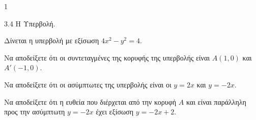 \begin{ylh}{1}
    \item 3.4 Η Υπερβολή.
\end{ylh}
Δίνεται η υπερβολή με εξίσωση $4x^2 - y^2 = 4$.
\begin{alist}
\item Να αποδείξετε ότι οι συντεταγμένες της κορυφής της υπερβολής είναι $A(1,0)$ και $A'(-1,0)$. 
\item Να αποδείξετε ότι οι ασύμπτωτες της υπερβολής είναι οι $y = 2x$ και $y = -2x$. 
\item Να αποδείξετε ότι η ευθεία που διέρχεται από την κορυφή $A$ και είναι παράλληλη προς την ασύμπτωτη $y = -2x$ έχει εξίσωση $y = -2x + 2$. 
\end{alist}